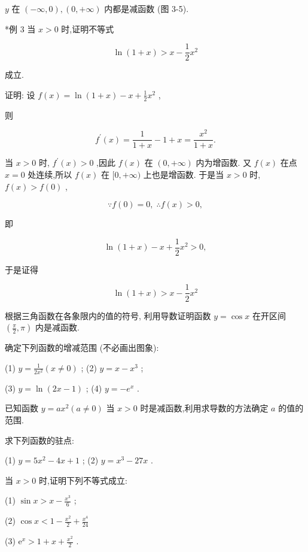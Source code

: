 \documentclass[lang=cn,newtx,12pt,scheme=chinese]{elegantbook}
\begin{document}
\(y\) 在 \(\left( {-\infty ,0}\right) ,\left( {0, + \infty }\right)\) 内都是减函数 (图 3-5).

*例 3 当 \(x > 0\) 时,证明不等式

\[
\ln \left( {1 + x}\right) > x - \frac{1}{2}{x}^{2}
\]

成立.

证明: 设 \(f\left( x\right) = \ln \left( {1 + x}\right) - x + \frac{1}{2}{x}^{2}\) ,

则

\[
{f}^{\prime }\left( x\right) = \frac{1}{1 + x} - 1 + x = \frac{{x}^{2}}{1 + x}.
\]

当 \(x > 0\) 时, \({f}^{\prime }\left( x\right) > 0\) ,因此 \(f\left( x\right)\) 在 \(\left( {0, + \infty }\right)\) 内为增函数. 又 \(f\left( x\right)\) 在点 \(x = 0\) 处连续,所以 \(f\left( x\right)\) 在 \(\lbrack 0, + \infty )\) 上也是增函数. 于是当 \(x > 0\) 时, \(f\left( x\right) > f\left( 0\right)\) ,

\[
\because f\left( 0\right) = 0,\;\therefore f\left( x\right) > 0,
\]

即

\[
\ln \left( {1 + x}\right) - x + \frac{1}{2}{x}^{2} > 0,
\]

于是证得

\[
\ln \left( {1 + x}\right) > x - \frac{1}{2}{x}^{2}
\]

\begin{problemset}[练习]

\item 根据三角函数在各象限内的值的符号, 利用导数证明函数 \(y = \cos x\) 在开区间 \(\left( {\frac{\pi }{2},\pi }\right)\) 内是减函数.

\item 确定下列函数的增减范围 (不必画出图象):

(1) \(y = \frac{1}{2{x}^{2}}\left( {x \neq 0}\right)\) ; (2) \(y = x - {x}^{3}\) ;

(3) \(y = \ln \left( {{2x} - 1}\right)\) ; (4) \(y = - {e}^{x}\) .

\item 已知函数 \(y = a{x}^{2}\left( {a \neq 0}\right)\) 当 \(x > 0\) 时是减函数,利用求导数的方法确定 \(a\) 的值的范围.

\item 求下列函数的驻点:

(1) \(y = 5{x}^{2} - {4x} + 1\) ; (2) \(y = {x}^{3} - {27x}\) .

\item* 当 \(x > 0\) 时,证明下列不等式成立:

(1) \(\sin x > x - \frac{{x}^{3}}{6}\) ;

(2) \(\cos x < 1 - \frac{{x}^{2}}{2} + \frac{{x}^{4}}{24}\)

(3) \({\mathrm{e}}^{x} > 1 + x + \frac{{x}^{2}}{2}\) .


\end{problemset}
\end{document}
